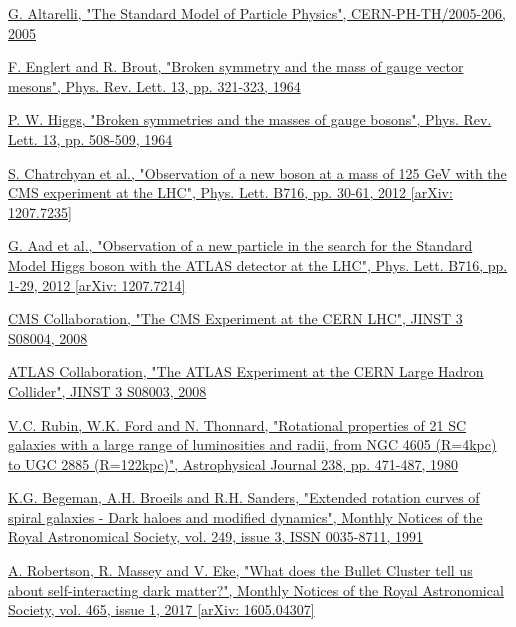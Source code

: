 \documentclass[a4paper, 10pt, openright]{report}
\begin{document}

\begin{thebibliography}{1}

\href{https://arxiv.org/abs/hep-ph/0510281}{G. Altarelli,
"The Standard Model of Particle Physics",
CERN-PH-TH/2005-206, 2005}

\href{https://journals.aps.org/prl/abstract/10.1103/PhysRevLett.13.321}{F. Englert and R. Brout, 
"Broken symmetry and the mass of gauge vector mesons",
Phys. Rev. Lett. 13, pp. 321-323, 1964}

\href{https://journals.aps.org/prl/abstract/10.1103/PhysRevLett.13.508}{P. W. Higgs, 
"Broken symmetries and the masses of gauge bosons",
Phys. Rev. Lett. 13, pp. 508-509, 1964}

\href{https://arxiv.org/abs/1207.7235}{S. Chatrchyan et al.,
"Observation of a new boson at a mass of 125 GeV with the CMS experiment at the LHC",
Phys. Lett. B716, pp. 30-61, 2012 [arXiv: 1207.7235]
}

\href{https://arxiv.org/abs/1207.7214}{G. Aad et al.,
"Observation of a new particle in the search for the Standard Model Higgs boson with the ATLAS detector at the LHC", 
Phys. Lett. B716, pp. 1-29, 2012 [arXiv: 1207.7214]}

\href{http://inspirehep.net/record/796887/}{CMS Collaboration,
"The CMS Experiment at the CERN LHC",
JINST 3 S08004, 2008}

\href{http://inspirehep.net/record/796888/}{ATLAS Collaboration,
"The ATLAS Experiment at the CERN Large Hadron Collider",
JINST 3 S08003, 2008}

\href{https://ui.adsabs.harvard.edu/abs/1980ApJ...238..471R/abstract}{V.C. Rubin, W.K. Ford and N. Thonnard,
"Rotational properties of 21 SC galaxies with a large range of luminosities and radii, from NGC 4605 (R=4kpc) to UGC 2885 (R=122kpc)",
Astrophysical Journal 238, pp. 471-487, 1980}

\href{https://academic.oup.com/mnras/article/249/3/523/1005565}{K.G. Begeman, A.H. Broeils and R.H. Sanders,
"Extended rotation curves of spiral galaxies - Dark haloes and modified dynamics",
Monthly Notices of the Royal Astronomical Society, vol. 249, issue 3, ISSN 0035-8711, 1991}

\href{https://arxiv.org/abs/1605.04307}{A. Robertson, R. Massey and V. Eke,
"What does the Bullet Cluster tell us about self-interacting dark matter?",
Monthly Notices of the Royal Astronomical Society, vol. 465, issue 1, 2017 [arXiv: 1605.04307]}


\end{thebibliography}
\end{document}
